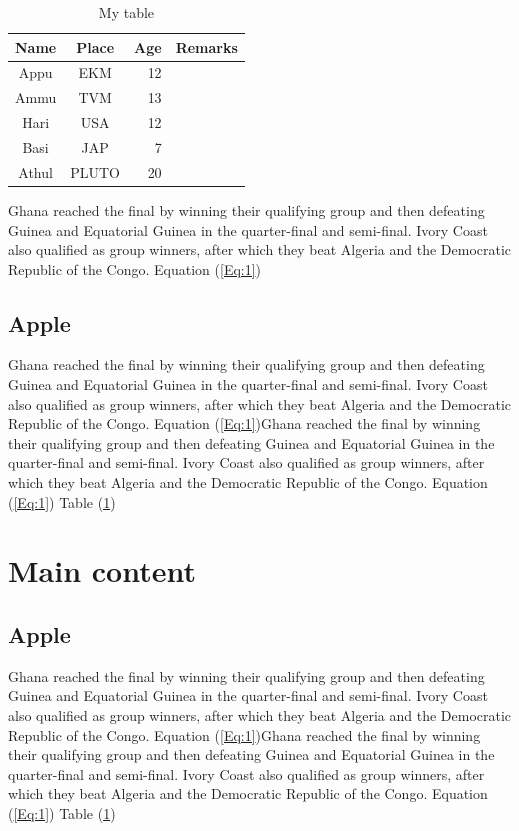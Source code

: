 \documentclass[11pt,a4]{article}
\begin{document}
\begin{table}[h]
	\begin{center}
		\begin{tabular}{|c|c|r|c|}
			\hline
			\rule[-1ex]{0pt}{2.5ex} Name & Place & Age & Remarks \\
			\hline
			\rule[-1ex]{0pt}{2.5ex} Appu & EKM & 12 &  \\
			\hline
			\rule[-1ex]{0pt}{2.5ex} Ammu & TVM & 13 &  \\
			\hline
			\rule[-1ex]{0pt}{2.5ex} Hari & USA &12  &  \\
			\hline
			\rule[-1ex]{0pt}{2.5ex} Basi & JAP  & 7 &  \\
			\hline
			\rule[-1ex]{0pt}{2.5ex} Athul & PLUTO & 20 &  \\
			\hline
		\end{tabular}
	\end{center}
\caption{My table}
\label{tab:1}
\end{table}


Ghana reached the final by winning their qualifying group and then defeating Guinea and Equatorial Guinea in the quarter-final and semi-final. Ivory Coast also qualified as group winners, after which they beat Algeria and the Democratic Republic of the Congo. Equation (\ref{Eq:1})
\subsection{Apple}
Ghana reached the final by winning their qualifying group and then defeating Guinea and Equatorial Guinea in the quarter-final and semi-final. Ivory Coast also qualified as group winners, after which they beat Algeria and the Democratic Republic of the Congo. Equation (\ref{Eq:1})Ghana reached the final by winning their qualifying group and then defeating Guinea and Equatorial Guinea in the quarter-final and semi-final. Ivory Coast also qualified as group winners, after which they beat Algeria and the Democratic Republic of the Congo. Equation (\ref{Eq:1}) Table (\ref{tab:1})




\section{Main content}

\subsection{Apple}
Ghana reached the final by winning their qualifying group and then defeating Guinea and Equatorial Guinea in the quarter-final and semi-final. Ivory Coast also qualified as group winners, after which they beat Algeria and the Democratic Republic of the Congo. Equation (\ref{Eq:1})Ghana reached the final by winning their qualifying group and then defeating Guinea and Equatorial Guinea in the quarter-final and semi-final. Ivory Coast also qualified as group winners, after which they beat Algeria and the Democratic Republic of the Congo. Equation (\ref{Eq:1}) Table (\ref{tab:1})
\end{document}
